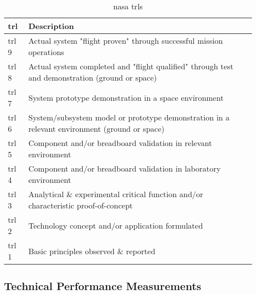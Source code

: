 \begin{table}
	\caption{\gls{nasa} \glspl{trl} \cite{NASA2007}}
	\begin{tabular}{|p{}|p{}|}
		\hline
		\textbf{\acrfull{trl}} & \textbf{Description} \\ \hline \hline
		\gls{trl} 9& Actual system "flight proven" through successful mission operations\\
		\gls{trl} 8& Actual system completed and "flight qualified" through test and demonstration (ground or space)\\
		\gls{trl} 7& System prototype demonstration in a space environment\\
		\gls{trl} 6& System/subsystem model or prototype demonstration in a relevant environment (ground or space)\\
		\gls{trl} 5& Component and/or breadboard validation in relevant environment\\
		\gls{trl} 4& Component and/or breadboard validation in laboratory environment\\
		\gls{trl} 3& Analytical \& experimental critical function and/or characteristic proof-of-concept\\
		\gls{trl} 2& Technology concept and/or application formulated\\
		\gls{trl} 1& Basic principles observed \& reported \\
		\hline
	\end{tabular}
\end{table}
\subsection{Technical Performance Measurements}
\label{subsec:tpms}